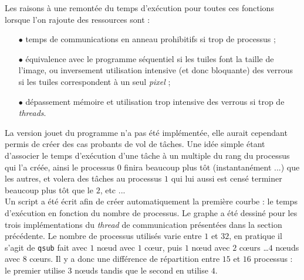 Les raisons à une remontée du temps d'exécution pour toutes ces fonctions lorsque l'on rajoute des ressources sont : 
\begin{itemize}
\item[$\bullet$] temps de communications en anneau prohibitifs si trop de processus ;
\item[$\bullet$] équivalence avec le programme séquentiel si les tuiles font la taille de l'image, ou inversement utilisation intensive (et donc bloquante) des verrous si les tuiles correspondent à un seul \emph{pixel} ;
\item[$\bullet$] dépassement mémoire et utilisation trop intensive des verrous si trop de \emph{threads}.
\end{itemize}

La version jouet du programme n'a pas été implémentée, elle aurait cependant permis de créer des cas probants de vol de tâches. Une idée simple étant d'associer le temps d'exécution d'une tâche à un multiple du rang du processus qui l'a créée, ainsi le processus $0$ finira beaucoup plus tôt (instantanément ...) que les autres, et volera des tâches au processus $1$ qui lui aussi est censé terminer beaucoup plus tôt que le $2$, etc ...\\
Un script a été écrit afin de créer automatiquement la première courbe : le temps d'exécution en fonction du nombre de processus. Le graphe a été dessiné pour les trois implémentations du \emph{thread} de communication présentées dans la section précédente. Le nombre de processus utilisés varie entre $1$ et $32$, en pratique il s'agit de \texttt{qsub} fait avec $1$ n\oe ud avec $1$ c\oe ur, puis $1$ n\oe ud avec $2$ c\oe urs \ldots $4$ n\oe uds avec $8$ c\oe urs. Il y a donc une différence de répartition entre $15$ et $16$ processus : le premier utilise $3$ n\oe uds tandis que le second en utilise $4$.
